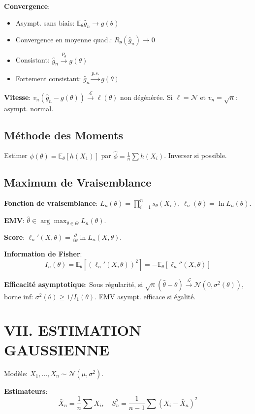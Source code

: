 \documentclass[8pt,twocolumn]{article}
\newcommand{\mydef}[1]{\textcolor{defcolor}{\textbf{#1}}}
\newcommand{\myprop}[1]{\textcolor{propcolor}{\textbf{#1}}}
\newcommand{\E}{\mathbb{E}}
\begin{document}
\mydef{Convergence}:
\begin{itemize}[nosep]
\item Asympt. sans biais: $\E_\theta\hat{g}_n \to g(\theta)$
\item Convergence en moyenne quad.: $R_\theta(\hat{g}_n) \to 0$
\item Consistant: $\hat{g}_n \xrightarrow{P_\theta} g(\theta)$
\item Fortement consistant: $\hat{g}_n \xrightarrow{p.s.} g(\theta)$
\end{itemize}

\mydef{Vitesse}: $v_n(\hat{g}_n - g(\theta)) \xrightarrow{\mathcal{L}} \ell(\theta)$ non dégénérée. Si $\ell = \mathcal{N}$ et $v_n=\sqrt{n}$: asympt. normal.

\subsection{Méthode des Moments}
Estimer $\phi(\theta)=\E_\theta[h(X_1)]$ par $\hat{\phi}=\frac{1}{n}\sum h(X_i)$. Inverser si possible.

\subsection{Maximum de Vraisemblance}
\mydef{Fonction de vraisemblance}: $L_n(\theta)=\prod_{i=1}^n s_\theta(X_i)$, $\ell_n(\theta)=\ln L_n(\theta)$.

\mydef{EMV}: $\hat{\theta} \in \arg\max_{\theta\in\Theta} L_n(\theta)$.

\mydef{Score}: $\ell_n'(X,\theta)=\frac{\partial}{\partial\theta}\ln L_n(X,\theta)$.

\mydef{Information de Fisher}: 
$$I_n(\theta)=\E_\theta[(\ell_n'(X,\theta))^2] = -\E_\theta[\ell_n''(X,\theta)]$$

\myprop{Efficacité asymptotique}: Sous régularité, si $\sqrt{n}(\hat{\theta}-\theta) \xrightarrow{\mathcal{L}} \mathcal{N}(0,\sigma^2(\theta))$, borne inf: $\sigma^2(\theta) \geq 1/I_1(\theta)$. EMV asympt. efficace si égalité.

\section*{\mydef{VII. ESTIMATION GAUSSIENNE}}

Modèle: $X_1,\dots,X_n \sim \mathcal{N}(\mu,\sigma^2)$.

\mydef{Estimateurs}:
$$\bar{X}_n=\frac{1}{n}\sum X_i,\quad S_n^2=\frac{1}{n-1}\sum(X_i-\bar{X}_n)^2$$
\end{document}
